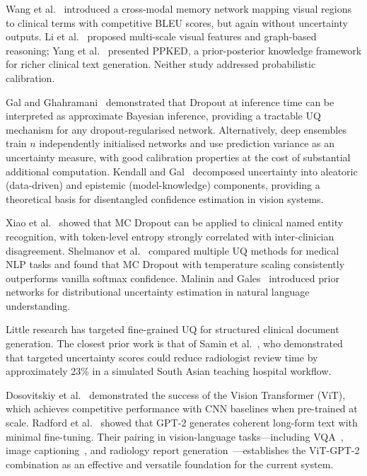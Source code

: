 \documentclass{jcst}
\begin{document}
Wang et al.~\cite{wang2021cross} introduced a cross-modal memory network mapping visual
regions to clinical terms with competitive BLEU scores, but again without uncertainty outputs.
Li et al.~\cite{li2021} proposed multi-scale visual features and graph-based reasoning; Yang
et al.~\cite{yang2021} presented PPKED, a prior-posterior knowledge framework for richer
clinical text generation. Neither study addressed probabilistic calibration.

Gal and Ghahramani~\cite{gal2016} demonstrated that Dropout at inference time can be
interpreted as approximate Bayesian inference, providing a tractable UQ mechanism for any
dropout-regularised network. Alternatively, deep ensembles~\cite{lakshminarayanan2017} train
$n$ independently initialised networks and use prediction variance as an uncertainty measure,
with good calibration properties at the cost of substantial additional computation. Kendall and
Gal~\cite{kendall2017} decomposed uncertainty into aleatoric (data-driven) and epistemic
(model-knowledge) components, providing a theoretical basis for disentangled confidence
estimation in vision systems.

Xiao et al.~\cite{xiao2018} showed that MC Dropout can be applied to clinical named entity
recognition, with token-level entropy strongly correlated with inter-clinician disagreement.
Shelmanov et al.~\cite{shelmanov2021} compared multiple UQ methods for medical NLP tasks
and found that MC Dropout with temperature scaling consistently outperforms vanilla softmax
confidence. Malinin and Gales~\cite{malinin2018} introduced prior networks for distributional
uncertainty estimation in natural language understanding.

Little research has targeted fine-grained UQ for structured clinical document generation. The
closest prior work is that of Samin et al.~\cite{samin2024}, who demonstrated that targeted
uncertainty scores could reduce radiologist review time by approximately 23\% in a simulated
South Asian teaching hospital workflow.

Dosovitskiy et al.~\cite{dosovitskiy2021} demonstrated the success of the Vision Transformer
(ViT), which achieves competitive performance with CNN baselines when pre-trained at scale.
Radford et al.~\cite{radford2019} showed that GPT-2 generates coherent long-form text with
minimal fine-tuning. Their pairing in vision-language tasks---including VQA~\cite{li2022},
image captioning~\cite{mokady2021}, and radiology report
generation~\cite{nicolson2023,wang2023}---establishes the ViT-GPT-2 combination as an
effective and versatile foundation for the current system.
\end{document}
